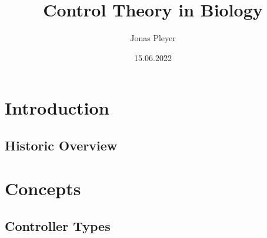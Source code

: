 \documentclass[10pt, compress]{beamer}
\title{Control Theory in Biology}
\subtitle{}
\date{15.06.2022}
\author{Jonas Pleyer}
\institute{Freiburg Center for Data Analysis and Modeling (FDM)}
\begin{document}
\maketitle

\section{Introduction}
\label{sec:introduction}
\subsection{Historic Overview}
\label{subsec:introduction-history}
\begin{frame}{\insertsubsection}
	
\end{frame}
%
%
\begin{frame}{\insertsubsection}
	
\end{frame}
%
%
\section{Concepts}
\label{sec:concepts}
\subsection{Controller Types}
\label{subsec:concepts-pid-controllers}
\begin{frame}{\insertsubsection}
	
\end{frame}
%
%
\end{document}
